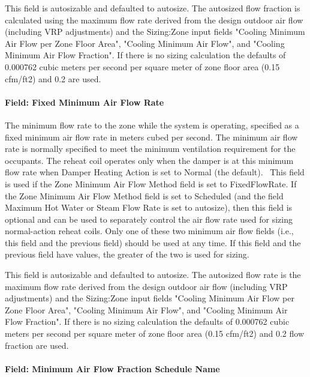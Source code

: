 This field is autosizable and defaulted to autosize. The autosized flow fraction is calculated using the maximum flow rate derived from the design outdoor air flow (including VRP adjustments) and the Sizing:Zone input fields "Cooling Minimum Air Flow per Zone Floor Area", "Cooling Minimum Air Flow", and "Cooling Minimum Air Flow Fraction". If there is no sizing calculation the defaults of 0.000762 cubic meters per second per square meter of zone floor area (0.15 cfm/ft2) and 0.2 are used.

\paragraph{Field: Fixed Minimum Air Flow Rate}\label{field-fixed-minimum-air-flow-rate}

The minimum flow rate to the zone while the system is operating, specified as a fixed minimum air flow rate in meters cubed per second. The minimum air flow rate is normally specified to meet the minimum ventilation requirement for the occupants. The reheat coil operates only when the damper is at this minimum flow rate when Damper Heating Action is set to Normal (the default).~ This field is used if the Zone Minimum Air Flow Method field is set to FixedFlowRate. If the Zone Minimum Air Flow Method field is set to Scheduled (and the field Maximum Hot Water or Steam Flow Rate is set to autosize), then this field is optional and can be used to separately control the air flow rate used for sizing normal-action reheat coils. Only one of these two minimum air flow fields (i.e., this field and the previous field) should be used at any time. If this field and the previous field have values, the greater of the two is used for sizing.

This field is autosizable and defaulted to autosize. The autosized flow rate is the maximum flow rate derived from the design outdoor air flow (including VRP adjustments) and the Sizing:Zone input fields "Cooling Minimum Air Flow per Zone Floor Area", "Cooling Minimum Air Flow", and "Cooling Minimum Air Flow Fraction". If there is no sizing calculation the defaults of 0.000762 cubic meters per second per square meter of zone floor area (0.15 cfm/ft2) and 0.2 flow fraction are used.

\paragraph{Field: Minimum Air Flow Fraction Schedule Name}\label{field-minimum-air-flow-fraction-schedule-name}

